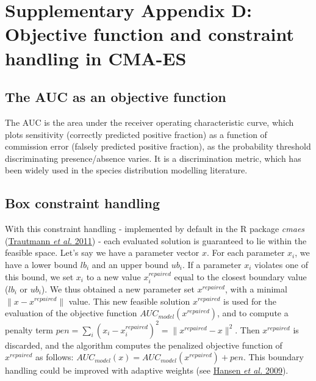 \documentclass[11pt,]{article}
\begin{document}
\newpage

\hypertarget{appendixD}{%
\section{Supplementary Appendix D: Objective function and constraint
handling in CMA-ES}\label{appendixD}}

\renewcommand*\thetable{D.\arabic{table}}
\renewcommand*\thefigure{D.\arabic{figure}}

\setcounter{figure}{0}
\setcounter{table}{0}

\renewcommand*{\thepage}{D--\arabic{page}}

\hfill \break

\hypertarget{the-auc-as-an-objective-function}{%
\subsection{The AUC as an objective
function}\label{the-auc-as-an-objective-function}}

The AUC is the area under the receiver operating characteristic curve,
which plots sensitivity (correctly predicted positive fraction) as a
function of commission error (falsely predicted positive fraction), as
the probability threshold discriminating presence/absence varies. It is
a discrimination metric, which has been widely used in the species
distribution modelling literature.

\hypertarget{box-constraint-handling}{%
\subsection{Box constraint handling}\label{box-constraint-handling}}

With this constraint handling - implemented by default in the R package
\emph{cmaes} (\protect\hyperlink{ref-Trautmann2011}{Trautmann \emph{et
al.} 2011}) - each evaluated solution is guaranteed to lie within the
feasible space. Let's say we have a parameter vector \(x\). For each
parameter \(x_i\), we have a lower bound \(lb_i\) and an upper bound
\(ub_i\). If a parameter \(x_i\) violates one of this bound, we set
\(x_i\) to a new value \(x_i^{repaired}\) equal to the closest boundary
value (\(lb_i\) or \(ub_i\)). We thus obtained a new parameter set
\(x^{repaired}\), with a minimal \(\|x-x^{repaired}\|\) value. This new
feasible solution \(x^{repaired}\) is used for the evaluation of the
objective function \(AUC_{model}(x^{repaired})\), and to compute a
penalty term
\(pen=\sum\limits_{i}(x_i-x_i^{repaired})^2=\|x^{repaired}-x\|^2\). Then
\(x^{repaired}\) is discarded, and the algorithm computes the penalized
objective function of \(x^{repaired}\) as follows:
\(AUC_{model}(x)=AUC_{model}(x^{repaired})+pen\). This boundary handling
could be improved with adaptive weights (see
\protect\hyperlink{ref-Hansen2009}{Hansen \emph{et al.} 2009}).
\end{document}
